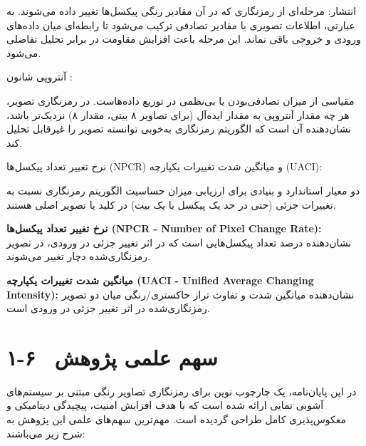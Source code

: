 انتشار:
مرحله‌ای از رمزنگاری که در آن مقادیر رنگی پیکسل‌ها تغییر داده می‌شوند. به عبارتی، اطلاعات تصویری با مقادیر تصادفی ترکیب می‌شود تا رابطه‌ای میان داده‌های ورودی و خروجی باقی نماند. این مرحله باعث افزایش مقاومت در برابر تحلیل تفاضلی می‌شود.

آنتروپی شانون :

مقیاسی از میزان تصادفی‌بودن یا بی‌نظمی در توزیع داده‌هاست. در رمزنگاری تصویر، هر چه مقدار آنتروپی به مقدار ایده‌آل (برای تصاویر ۸ بیتی، مقدار ۸) نزدیک‌تر باشد، نشان‌دهنده آن است که الگوریتم رمزنگاری به‌خوبی توانسته تصویر را غیرقابل تحلیل کند.

نرخ تغییر تعداد پیکسل‌ها (‎NPCR‎) و میانگین شدت تغییرات یکپارچه (‎UACI‎):

دو معیار استاندارد و بنیادی برای ارزیابی میزان حساسیت الگوریتم رمزنگاری نسبت به تغییرات جزئی (حتی در حد یک پیکسل یا یک بیت) در کلید یا تصویر اصلی هستند.

\textbf{نرخ تغییر تعداد پیکسل‌ها (‎NPCR - Number of Pixel Change Rate‎):} نشان‌دهنده درصد تعداد پیکسل‌هایی است که در اثر تغییر جزئی در ورودی، در تصویر رمزنگاری‌شده دچار تغییر می‌شوند.

\textbf{میانگین شدت تغییرات یکپارچه (‎UACI - Unified Average Changing Intensity‎):} نشان‌دهنده میانگین شدت و تفاوت تراز خاکستری/رنگی میان دو تصویر رمزنگاری‌شده در اثر تغییر جزئی در ورودی است.

\section{۱-۶  سهم علمی پژوهش}

در این پایان‌نامه، یک چارچوب نوین برای رمزنگاری تصاویر رنگی مبتنی بر سیستم‌های آشوبی نمایی ارائه شده است که با هدف افزایش امنیت، پیچیدگی دینامیکی و معکوس‌پذیری کامل طراحی گردیده است. مهم‌ترین سهم‌های علمی این پژوهش به شرح زیر می‌باشند:

